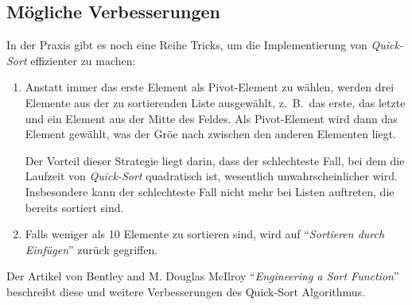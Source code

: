 \subsection{M\"ogliche Verbesserungen}
In der Praxis gibt es noch eine Reihe Tricks, um die Implementierung von \emph{Quick-Sort}
effizienter zu machen:
\begin{enumerate}
\item Anstatt immer das erste Element als Pivot-Element zu w\"ahlen,
      werden drei Elemente aus der zu sortierenden Liste ausgew\"ahlt,
      z.~B.~das erste, das letzte und ein Element aus der Mitte des Feldes.
      Als Pivot-Element wird dann das Element gew\"ahlt, was der Gr\"o\3e nach zwischen den
      anderen Elementen liegt.

      Der Vorteil dieser Strategie liegt darin, dass der schlechteste Fall, bei dem die Laufzeit
      von \emph{Quick-Sort} quadratisch ist, wesentlich unwahrscheinlicher wird.
      Insbesondere kann der schlechteste Fall nicht mehr bei Listen auftreten, die bereits
      sortiert sind.
\item Falls weniger als 10 Elemente zu sortieren sind, wird auf ``\emph{Sortieren durch Einf\"ugen}''
      zur\"uck gegriffen.
\end{enumerate}
Der Artikel von Bentley and M. Douglas McIlroy ``\emph{Engineering a Sort Function}''
\cite{bentley:93} beschreibt diese und weitere Verbesserungen des Quick-Sort Algorithmus. 



